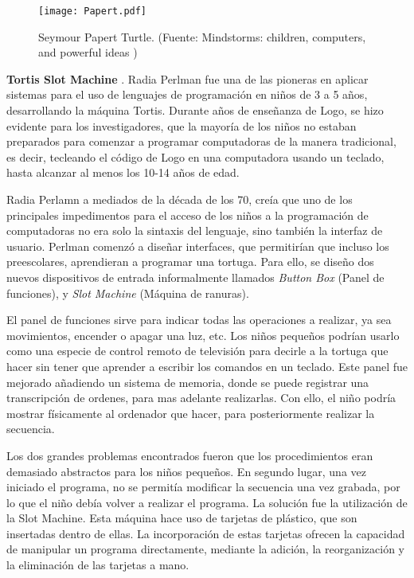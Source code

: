 \begin{figure}[!h]
\begin{center}
\texttt{[image: Papert.pdf]}
\caption{Seymour Papert Turtle. (Fuente: Mindstorms: children, computers, and powerful ideas \cite{Papert})}
\label{fig:Papert}
\end{center}
\end{figure}

\textbf{Tortis Slot Machine} \cite{Perlman}. 
Radia Perlman fue una de las pioneras en aplicar sistemas para el uso de lenguajes de programación en niños de 3 a 5 años, desarrollando la máquina Tortis. Durante años de enseñanza de Logo, se hizo evidente para los investigadores, que la mayoría de los niños no estaban preparados para comenzar a programar computadoras de la manera tradicional, es decir, tecleando el código de Logo en una computadora usando un teclado, hasta alcanzar al menos los 10-14 años de edad. 

Radia Perlamn a mediados de la década de los 70, creía que uno de los principales impedimentos para el acceso de los niños a la programación de computadoras no era solo la sintaxis del lenguaje, sino también la interfaz de usuario. Perlman comenzó a diseñar interfaces, que permitirían que incluso los preescolares, aprendieran a programar una tortuga. Para ello, se diseño dos nuevos dispositivos de entrada informalmente llamados \textit{Button Box} (Panel de funciones), y \textit{Slot Machine} (Máquina de ranuras). 

El panel de funciones sirve para indicar todas las operaciones a realizar, ya sea movimientos, encender o apagar una luz, etc. Los niños pequeños podrían usarlo como una especie de control remoto de televisión para decirle a la tortuga que hacer sin tener que aprender a escribir los comandos en un teclado. Este panel fue mejorado añadiendo un sistema de memoria, donde se puede registrar una transcripción de ordenes, para mas adelante realizarlas. Con ello, el niño podría mostrar físicamente al ordenador que hacer, para posteriormente realizar la secuencia.

Los dos grandes problemas encontrados fueron que los procedimientos eran demasiado abstractos para los niños pequeños. En segundo lugar, una vez iniciado el programa, no se permitía modificar la secuencia una vez grabada, por lo que el niño debía volver a realizar el programa. La solución fue la utilización de la Slot Machine. Esta máquina hace uso de tarjetas de plástico, que son insertadas dentro de ellas. La incorporación de estas tarjetas ofrecen la capacidad de manipular un programa directamente, mediante la adición, la reorganización y la eliminación de las tarjetas a mano.

